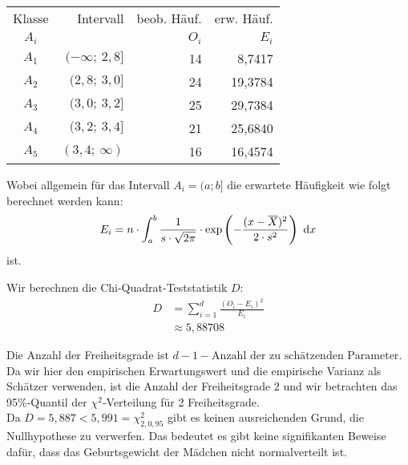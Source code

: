 \documentclass[main.tex]{subfiles}
\begin{document}
\begin{center}
\begin{tabular}{c|r|r|r}
Klasse & Intervall            & beob. Häuf. & erw. Häuf.\\
$A_i$  &                      & $O_i$             & $E_i$ \\\hline
$A_1$  & $(-\infty;\ 2,8   ]$ & 14                &  8,7417 \\
$A_2$  & $(    2,8;\ 3,0   ]$ & 24                & 19,3784 \\
$A_3$  & $(    3,0;\ 3,2   ]$ & 25                & 29,7384 \\
$A_4$  & $(    3,2;\ 3,4   ]$ & 21                & 25,6840 \\
$A_5$  & $(    3,4;\ \infty)$ & 16                & 16,4574 \\
\end{tabular}
\end{center}

Wobei allgemein für das Intervall $A_i = (a; b]$ die erwartete Häufigkeit wie folgt berechnet werden kann:
$$
    E_i = n \cdot \int_{a}^{b} \frac{1}{s\cdot \sqrt{2\pi}} \cdot \exp\left(-\frac{(x-\overline{X})^2}{2\cdot s^2} \right) ~\mathrm{d}x
$$
ist.

Wir berechnen die Chi-Quadrat-Teststatistik $D$:
$$\begin{aligned}
    D &= \sum_{i=1}^{d} \frac{(O_i - E_i)^2}{E_i} \\[2mm]
    &\approx 5,88708
\end{aligned}$$

Die Anzahl der Freiheitsgrade ist $d - 1 - \text{Anzahl der zu schätzenden Parameter}$. Da wir hier den empirischen Erwartungswert und die empirische Varianz als Schätzer verwenden, ist die Anzahl der Freiheitsgrade $2$ und wir betrachten das 95\%-Quantil der $\chi^2$-Verteilung für 2 Freiheitsgrade.\\

Da $D = 5,887 < 5,991 = \chi^2_{2, 0,95}$ gibt es keinen ausreichenden Grund, die Nullhypothese zu verwerfen. Das bedeutet es gibt keine signifikanten Beweise dafür, dass das Geburtsgewicht der Mädchen nicht normalverteilt ist.
\end{document}
